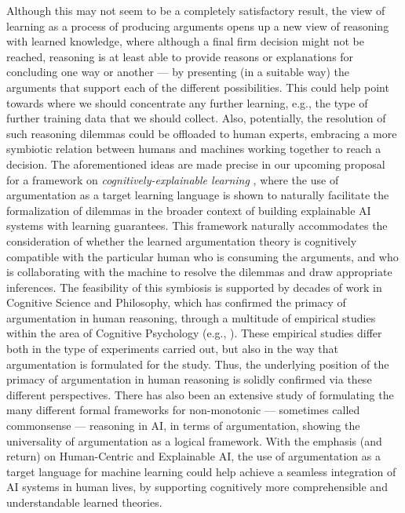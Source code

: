 Although this may not seem to be a completely satisfactory result, the view of learning as a process of producing arguments opens up a new view of reasoning with learned knowledge, where although a final firm decision might not be reached, reasoning is at least able to provide reasons or explanations for concluding one way or another --- by presenting (in a suitable way) the arguments that support each of the different possibilities. This could help point towards where we should concentrate any further learning, e.g., the type of further training data that we should collect. Also, potentially, the resolution of such reasoning dilemmas could be offloaded to human experts, embracing a more symbiotic relation between humans and machines working together to reach a decision.
The aforementioned ideas are made precise in our upcoming proposal for a framework on \emph{cognitively-explainable learning} , where the use of argumentation as a target learning language is shown to naturally facilitate the formalization of dilemmas in the broader context of building explainable AI systems with learning guarantees. This framework naturally accommodates the consideration of whether the learned argumentation theory is cognitively compatible with the particular human who is consuming the arguments, and who is collaborating with the machine to resolve the dilemmas and draw appropriate inferences.
The feasibility of this symbiosis is supported by decades of work in Cognitive Science and Philosophy, which has confirmed the primacy of argumentation in human reasoning, through a multitude of empirical studies within the area of Cognitive Psychology (e.g., ). These empirical studies differ both in the type of experiments carried out, but also in the way that argumentation is formulated for the study. Thus, the underlying position of the primacy of argumentation in human reasoning is solidly confirmed via these different perspectives.
There has also been an extensive study of formulating the many different formal frameworks for non-monotonic --- sometimes called commonsense --- reasoning in AI, in terms of argumentation, showing the universality of argumentation as a logical framework. With the emphasis (and return) on Human-Centric and Explainable AI, the use of argumentation as a target language for machine learning could help achieve a seamless integration of AI systems in human lives, by supporting cognitively more comprehensible and understandable learned theories.

